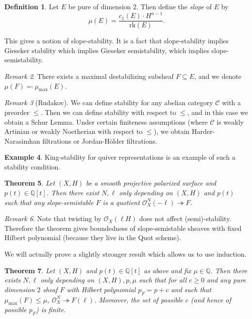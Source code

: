 \documentclass[leqno, openany]{memoir}
\newtheorem{thm}{Theorem}[section]
\theoremstyle{definition}
\newtheorem{defn}[thm]{Definition}
\newtheorem{exm}[thm]{Example}
\theoremstyle{remark}
\newtheorem{rmk}[thm]{Remark}
\theoremstyle{plain}
\theoremstyle{definition}
\theoremstyle{remark}
\newcommand{\Q}{\mathbb{Q}}
\newcommand{\mc}[1]{\mathcal{#1}}
\newcommand{\mr}[1]{\mathrm{#1}}
\begin{document}
\begin{defn}
    Let $E$ be pure of dimension $2$. Then define the \textit{slope} of $E$ by
    \[ \mu(E) = \frac{c_1(E) \cdot H^{n-1}}{\mr{rk}(E)}. \]
\end{defn}

This gives a notion of slope-stability. It is a fact that slope-stability implies Gieseker stability which implies Gieseker semistability, which implies slope-semistability.

\begin{rmk}
    There exists a maximal destabilizing subsheaf $F \subseteq E$, and we denote $\mu(F) \eqqcolon \mu_{\mr{max}}(E)$.
\end{rmk}

\begin{rmk}[Rudakov]
    We can define stability for any abelian category $\mc{C}$ with a preorder $\leq$. Then we can define stability with respect to $\leq$, and in this case we obtain a Schur Lemma. Under certain finiteness assumptions (where $\mc{C}$ is weakly Artinian or weakly Noetherian with respect to $\leq$), we obtain Harder-Narasimhan filtrations or Jordan-H\"older filtrations.
\end{rmk}

\begin{exm}
    King-stability for quiver representations is an example of such a stability condition.
\end{exm}

\begin{thm}
    Let $(X, H)$ be a smooth projective polarized surface and $p(t) \in \Q[t]$. Then there exist $N,\ell$ only depending on $(X, H)$ and $p(t)$ such that any slope-semistable $F$ is a quotient $\mc{O}_X^N(-\ell) \twoheadrightarrow F$.
\end{thm}

\begin{rmk}
    Note that twisting by $\mc{O}_X(\ell H)$ does not affect (semi)-stability. Therefore the theorem gives boundedness of slope-semistable sheaves with fixed Hilbert polynomial (because they live in the Quot scheme).
\end{rmk}

We will actually prove a slightly stronger result which allows us to use induction.
\begin{thm}
    Let $(X, H)$ and $p(t) \in \Q[t]$ as above and fix $\mu \in \Q$. Then there exists $N, \ell$ only depending on $(X,H), p, \mu$ such that for all $c \geq 0$ and any pure dimension $2$ sheaf $F$ with Hilbert polynomial $p_F = p + c$ and such that $\mu_{\mr{max}}(F) \leq \mu$, $\mc{O}_X^N \twoheadrightarrow F(\ell)$. Moreover, the set of possible $c$ (and hence of possible $p_F$) is finite.
\end{thm}
\end{document}
